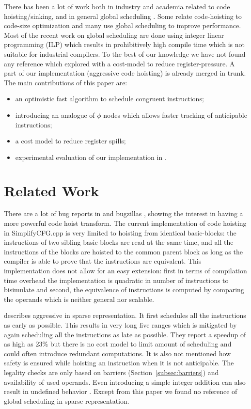 \documentclass[sigplan,10pt,review,anonymous]{acmart}\settopmatter{printfolios=true,printccs=false,printacmref=false}
\begin{document}
There has been a lot of work both in industry and academia related to code
hoisting/sinking, and in general global scheduling \cite{click1995global}. Some
relate code-hoisting to code-size optimization \cite{rosen1988global} and many
\cite{barany2013, shobaki2013} use global scheduling to improve
performance. Most of the recent work on global scheduling are done using integer
linear programming (ILP) which results in prohibitively high compile time which
is not suitable for industrial compilers. To the best of our knowledge we have
not found any reference which explored \gcm{} with a cost-model to reduce
register-pressure. A part of our implementation (aggressive code hoisting) is
already merged in \LLVM{} trunk. The main contributions of this paper are:
\begin{itemize}[leftmargin=*,topsep=0pt]
\item an optimistic fast algorithm to schedule congruent instructions;
\item introducing an analogue of $\phi$ nodes which allows faster tracking of
  anticipable instructions;
\item a cost model to reduce register spills;
\item experimental evaluation of our implementation in \LLVM{}.
\end{itemize}


\section{Related Work}
There are a lot of bug reports in \GCC{} and \LLVM{} bugzillas
\cite{GCCCodeHoistingBugs, LLVMCodeHoistingBugs}, showing the interest in having
a more powerful code hoist transform.  The current \LLVM{} implementation of
code hoisting in SimplifyCFG.cpp is very limited to hoisting from identical
basic-blocks: the instructions of two sibling basic-blocks are read at the same
time, and all the instructions of the blocks are hoisted to the common parent
block as long as the compiler is able to prove that the instructions are
equivalent.  This implementation does not allow for an easy extension: first in
terms of compilation time overhead the implementation is quadratic in number of
instructions to bisimulate and second, the equivalence of instructions is
computed by comparing the operands which is neither general nor scalable.

\citet{click1995global} describes aggressive \gcm{} in sparse representation. It
first schedules all the instructions as early as possible. This results in very
long live ranges which is mitigated by again scheduling all the instructions as
late as possible. They report a speedup of as high as $23\%$ but there is no
cost model to limit amount of scheduling and could often introduce redundant
computations. It is also not mentioned how safety is ensured while hoisting an
instruction when it is not anticipable. The legality checks are only based on
barriers (Section~\ref{subsec:barriers}) and availability of used operands. Even
introducing a simple integer addition can also result in undefined behavior
\cite{undef}.  Except from this paper we found no reference of global scheduling
in sparse representation.
\end{document}

